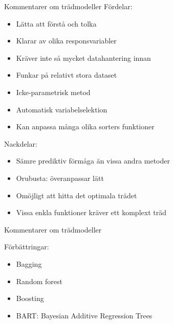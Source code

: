 \documentclass[10pt,english]{beamer}
\begin{document}
\begin{frame}{Kommentarer om trädmodeller}
    Fördelar:
    \begin{itemize}
        \item Lätta att förstå och tolka
        \item Klarar av olika responsvariabler
        \item Kräver inte så mycket datahantering innan
        \item Funkar på relativt stora dataset
        \item Icke-parametrisk metod
        \item Automatisk variabelselektion
        \item Kan anpassa många olika sorters funktioner
    \end{itemize}

    Nackdelar:
    \begin{itemize}
        \item Sämre prediktiv förmåga än vissa andra metoder
        \item Orubusta: överanpassar lätt
        \item Omöjligt att hitta det optimala trädet
        \item Vissa enkla funktioner kräver ett komplext träd
    \end{itemize}
\end{frame}

\begin{frame}{Kommentarer om trädmodeller}

    Förbättringar:
    \begin{itemize}
        \item Bagging
        \item Random forest
        \item Boosting
        \item BART: Bayesian Additive Regression Trees
    \end{itemize}
    
\end{frame}
\end{document}
